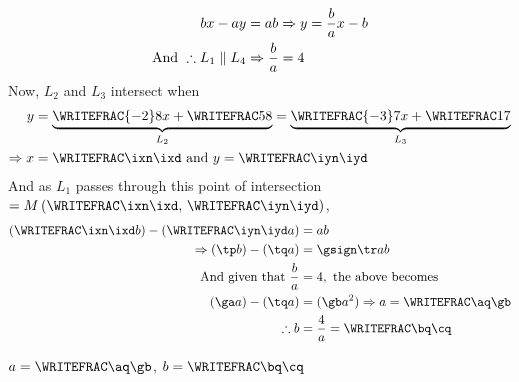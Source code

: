\begin{solution}[\halfpage]
	\begin{align}
		bx - ay &= ab \Rightarrow y = \dfrac{b}{a}x -b \\
		\text{And }\therefore L_1 \parallel L_4 &\Rightarrow \dfrac{b}{a} = 4 
	\end{align}
	Now, $L_2$ and $L_3$ intersect when 
	\begin{align}
		y &= \underbrace{\WRITEFRAC{-\vbone}\vbtwo x  + \WRITEFRAC\vbthree\vbtwo}_{L_2} 
		 = \underbrace{\WRITEFRAC{-\vbfour}\vbfive x + \WRITEFRAC\vbsix\vbfive}_{L_3} \\
		 \Rightarrow x &= \WRITEFRAC\ixn\ixd \text{ and } y = \WRITEFRAC\iyn\iyd
	\end{align}
	And as $L_1$ passes through this point of intersection 
	$ = M\left( \WRITEFRAC\ixn\ixd,\,\WRITEFRAC\iyn\iyd\right)$, 
	\begin{align}
		\left(\WRITEFRAC\ixn\ixd b\right) - \left( \WRITEFRAC\iyn\iyd a \right)&= ab \\
		\Rightarrow (\tp b) - (\tq a) &= \gsign\tr ab \\
		\text{And given that } \dfrac{b}{a} &= \vbseven, \text{ the above becomes } \\
		(\ga a) - (\tq a) &= (\gb a^2) \Rightarrow a = \WRITEFRAC\aq\gb \\
		\therefore b &= \frac{\vbseven}{a} = \WRITEFRAC\bq\cq
	\end{align}
\end{solution}

\ifprintanswers
  \begin{codex}
    $a=\WRITEFRAC\aq\gb$, $b=\WRITEFRAC\bq\cq$
  \end{codex}
\fi

